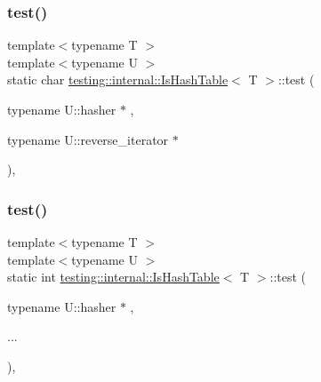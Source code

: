 \mbox{\label{structtesting_1_1internal_1_1_is_hash_table_acc4d1e2307a1e0527932da7a7d354f06}} 
\subsubsection{\texorpdfstring{test()}{test()}\hspace{0.1cm}{\footnotesize\ttfamily [7/9]}}
{\footnotesize\ttfamily template$<$typename T $>$ \\
template$<$typename U $>$ \\
static char \mbox{\hyperlink{structtesting_1_1internal_1_1_is_hash_table}{testing\+::internal\+::\+Is\+Hash\+Table}}$<$ T $>$\+::test (\begin{DoxyParamCaption}\item[{typename U\+::hasher $\ast$}]{,  }\item[{typename U\+::reverse\+\_\+iterator $\ast$}]{ }\end{DoxyParamCaption})\hspace{0.3cm}{\ttfamily [static]}, {\ttfamily [private]}}

\mbox{\label{structtesting_1_1internal_1_1_is_hash_table_a195b49a6ae5090b6266a5fa4ab771962}} 
\subsubsection{\texorpdfstring{test()}{test()}\hspace{0.1cm}{\footnotesize\ttfamily [8/9]}}
{\footnotesize\ttfamily template$<$typename T $>$ \\
template$<$typename U $>$ \\
static int \mbox{\hyperlink{structtesting_1_1internal_1_1_is_hash_table}{testing\+::internal\+::\+Is\+Hash\+Table}}$<$ T $>$\+::test (\begin{DoxyParamCaption}\item[{typename U\+::hasher $\ast$}]{,  }\item[{}]{... }\end{DoxyParamCaption})\hspace{0.3cm}{\ttfamily [static]}, {\ttfamily [private]}}

